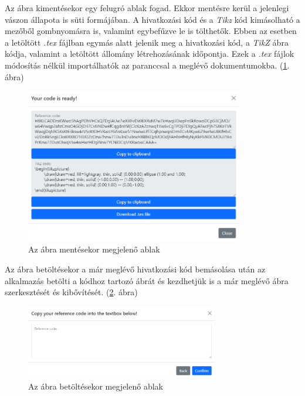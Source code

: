 Az ábra kimentésekor egy felugró ablak fogad. Ekkor mentésre kerül a jelenlegi vászon állapota is süti formájában. A hivatkozási kód és a \textit{Tikz} kód kimásolható a mezőből gombnyomásra is, valamint egybefűzve le is tölthetők. Ebben az esetben a letöltött \textit{.tex} fájlban egymás alatt jelenik meg a hivatkozási kód, a \textit{TikZ} ábra kódja, valamint a letöltött állomány létrehozásának időpontja. Ezek a \textit{.tex} fájlok módosítás nélkül importálhatók az \lstinline[style=latex]{} paranccsal a meglévő dokumentumokba. (\ref{fig:save}. ábra)

\begin{figure}[!h]
	\centering
	\includegraphics[width=0.85\textwidth]{images/save_modal.png}
	\caption{Az ábra mentésekor megjelenő ablak}
	\label{fig:save}
\end{figure}

Az ábra betöltésekor a már meglévő hivatkozási kód bemásolása után az alkalmazás betölti a kódhoz tartozó ábrát és kezdhetjük is a már meglévő ábra szerkesztését és kibővítését. (\ref{fig:load}. ábra)

\begin{figure}[!h]
	\centering
	\includegraphics[width=0.75\textwidth]{images/load_modal.png}
	\caption{Az ábra betöltésekor megjelenő ablak}
	\label{fig:load}
\end{figure}


